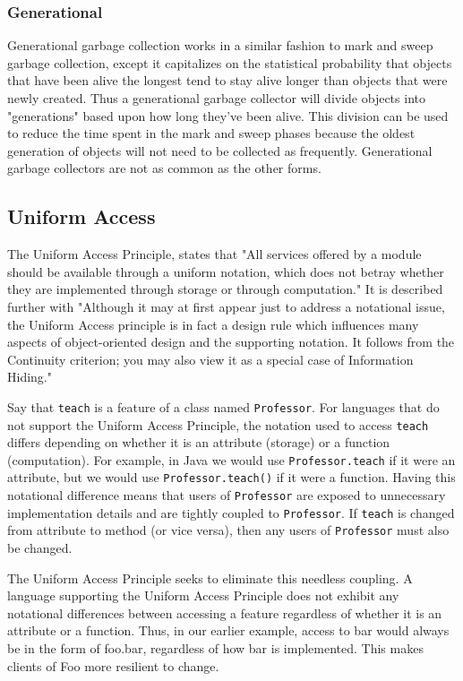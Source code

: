 \documentclass[12pt,a4paper,final,twoside,titlepage]{book}
\begin{document}
\subsubsection{Generational}
Generational garbage collection works in a similar fashion to mark and sweep garbage collection, except it capitalizes on the statistical probability that objects that have been alive the longest tend to stay alive longer than objects that were newly created. Thus a generational garbage collector will divide objects into "generations" based upon how long they've been alive. This division can be used to reduce the time spent in the mark and sweep phases because the oldest generation of objects will not need to be collected as frequently. Generational garbage collectors are not as common as the other forms.

\subsection{Uniform Access}
The Uniform Access Principle, states that "All services offered by a module should be available through a uniform notation, which does not betray whether they are implemented through storage or through computation." It is described further with "Although it may at first appear just to address a notational issue, the Uniform Access principle is in fact a design rule which influences many aspects of object-oriented design and the supporting notation. It follows from the Continuity criterion; you may also view it as a special case of Information Hiding."

Say that \texttt{teach} is a feature of a class named \texttt{Professor}. For languages that do not support the Uniform Access Principle, the notation used to access \texttt{teach} differs depending on whether it is an attribute (storage) or a function (computation). For example, in Java we would use \texttt{Professor.teach} if it were an attribute, but we would use \texttt{Professor.teach()} if it were a function. Having this notational difference means that users of \texttt{Professor} are exposed to unnecessary implementation details and are tightly coupled to \texttt{Professor}. If \texttt{teach} is changed from attribute to method (or vice versa), then any users of \texttt{Professor} must also be changed.

The Uniform Access Principle seeks to eliminate this needless coupling. A language supporting the Uniform Access Principle does not exhibit any notational differences between accessing a feature regardless of whether it is an attribute or a function. Thus, in our earlier example, access to bar would always be in the form of foo.bar, regardless of how bar is implemented. This makes clients of Foo more resilient to change.
\end{document}
